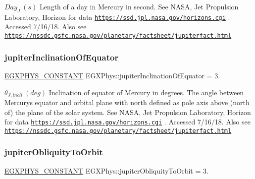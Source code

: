 $ Day_{J} \ (s)$ Length of a day in Mercury in second. See N\+A\+SA, Jet Propulsion Laboratory, Horizon for data \href{https://ssd.jpl.nasa.gov/horizons.cgi}{\tt https\+://ssd.\+jpl.\+nasa.\+gov/horizons.\+cgi} . Accessed 7/16/18. Also see \href{https://nssdc.gsfc.nasa.gov/planetary/factsheet/jupiterfact.html}{\tt https\+://nssdc.\+gsfc.\+nasa.\+gov/planetary/factsheet/jupiterfact.\+html} \mbox{\label{group___e_g_x_phys-_constants-_astrophysics-_solar_system-_jupiter-_orbit_ga9d8885ca3f314c675788ceec89e3a933}} 
\subsubsection{\texorpdfstring{jupiter\+Inclination\+Of\+Equator}{jupiterInclinationOfEquator}}
{\footnotesize\ttfamily \mbox{\hyperlink{group___e_g_x_phys-_constants-_macros_ga76980d288494ce1714c9ac68a95ba702}{E\+G\+X\+P\+H\+Y\+S\+\_\+\+C\+O\+N\+S\+T\+A\+NT}} E\+G\+X\+Phys\+::jupiter\+Inclination\+Of\+Equator = 3.}

$ \theta_{J,incli} \ (deg)$ Inclination of equator of Mercury in degrees. The angle between Mercury\textquotesingle{}s equator and orbital plane with north defined as pole axis above (north of) the plane of the solar system. See N\+A\+SA, Jet Propulsion Laboratory, Horizon for data \href{https://ssd.jpl.nasa.gov/horizons.cgi}{\tt https\+://ssd.\+jpl.\+nasa.\+gov/horizons.\+cgi} . Accessed 7/16/18. Also see \href{https://nssdc.gsfc.nasa.gov/planetary/factsheet/jupiterfact.html}{\tt https\+://nssdc.\+gsfc.\+nasa.\+gov/planetary/factsheet/jupiterfact.\+html} \mbox{\label{group___e_g_x_phys-_constants-_astrophysics-_solar_system-_jupiter-_orbit_ga80cd2231e9fa0fb10ecf5ea62fdc0ddb}} 
\subsubsection{\texorpdfstring{jupiter\+Obliquity\+To\+Orbit}{jupiterObliquityToOrbit}}
{\footnotesize\ttfamily \mbox{\hyperlink{group___e_g_x_phys-_constants-_macros_ga76980d288494ce1714c9ac68a95ba702}{E\+G\+X\+P\+H\+Y\+S\+\_\+\+C\+O\+N\+S\+T\+A\+NT}} E\+G\+X\+Phys\+::jupiter\+Obliquity\+To\+Orbit = 3.}

